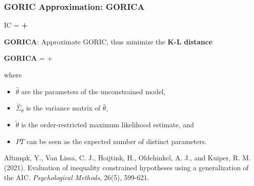 \documentclass[10pt]{beamer}\usepackage[]{graphicx}\usepackage[]{xcolor}
\begin{document}
\begin{frame}
	\frametitle{GORIC Approximation: GORICA}
	
	\centerline{	IC = \textbf{{\color{orange}{model misfit}} + {\color{purple}{model complexity}}}}
	\vspace{.5 cm}
	
	{\textbf{GORICA}: Approximate GORIC, thus minimize the \textbf{K-L distance}}
	
	\vspace{0.5cm}
	\centerline{{\textbf{GORICA} ={} + \color{purple}{$2 PT$}}}
	
	\vspace{.5 cm}
	
	where 
	\begin{itemize}
			\item $\hat{\theta}$ are the parameters of the unconstrained model,
			\item $\hat{\Sigma}_{\theta}$ is the variance matrix of $\hat{\theta}$,
			\item $\tilde{\theta}$ is the order-restricted maximum likelihood estimate, and
			\item $PT$ can be seen as the expected number of distinct parameters. %
		\end{itemize}
		
\vspace{.5 cm}

	\footnotesize{
	Alt{\i}n{\i}\c{s}{\i}k, Y., Van Lissa, C. J., Hoijtink, H., Oldehinkel, A. J., and Kuiper, R. M. (2021). Evaluation of inequality constrained hypotheses using a generalization of the AIC. \emph{Psychological Methods}, 26(5), 599-621. %
	}
	
\end{frame}
%
\end{document}
